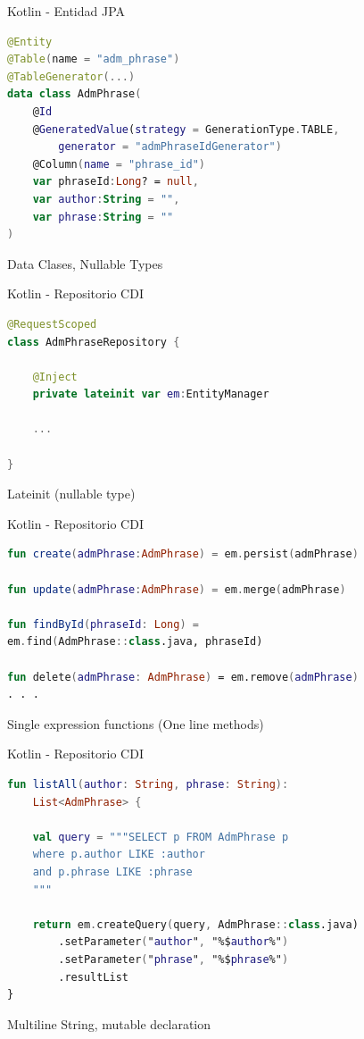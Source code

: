 \documentclass{beamer}
\begin{document}
\begin{frame}[fragile]{Kotlin - Entidad JPA}
\begin{lstlisting}[language=Kotlin]
@Entity
@Table(name = "adm_phrase")
@TableGenerator(...)
data class AdmPhrase(
	@Id
	@GeneratedValue(strategy = GenerationType.TABLE,
		generator = "admPhraseIdGenerator")
	@Column(name = "phrase_id")
	var phraseId:Long? = null,
	var author:String = "",
	var phrase:String = ""
)
\end{lstlisting}
Data Clases, Nullable Types
\end{frame}

\begin{frame}[fragile]{Kotlin - Repositorio CDI}
\begin{lstlisting}[language=Kotlin]
@RequestScoped
class AdmPhraseRepository {

	@Inject
	private lateinit var em:EntityManager
	
	...

}
\end{lstlisting}
Lateinit (nullable type)
\end{frame}

\begin{frame}[fragile]{Kotlin - Repositorio CDI}
\begin{lstlisting}[language=Kotlin]
fun create(admPhrase:AdmPhrase) = em.persist(admPhrase)

fun update(admPhrase:AdmPhrase) = em.merge(admPhrase)

fun findById(phraseId: Long) =
em.find(AdmPhrase::class.java, phraseId)

fun delete(admPhrase: AdmPhrase) = em.remove(admPhrase)
. . .
\end{lstlisting}
Single expression functions (One line methods)
\end{frame}

\begin{frame}[fragile]{Kotlin - Repositorio CDI}
\begin{lstlisting}[language=Kotlin]
fun listAll(author: String, phrase: String):
	List<AdmPhrase> {
	
	val query = """SELECT p FROM AdmPhrase p
	where p.author LIKE :author
	and p.phrase LIKE :phrase
	"""
	
	return em.createQuery(query, AdmPhrase::class.java)
		.setParameter("author", "%$author%")
		.setParameter("phrase", "%$phrase%")
		.resultList
}
\end{lstlisting}
Multiline String, mutable declaration
\end{frame}
\end{document}
